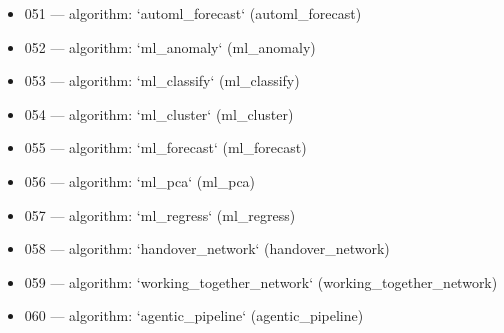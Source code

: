\begin{itemize}
  \item 051 — algorithm: `automl\_forecast` (automl\_forecast)
  \item 052 — algorithm: `ml\_anomaly` (ml\_anomaly)
  \item 053 — algorithm: `ml\_classify` (ml\_classify)
  \item 054 — algorithm: `ml\_cluster` (ml\_cluster)
  \item 055 — algorithm: `ml\_forecast` (ml\_forecast)
  \item 056 — algorithm: `ml\_pca` (ml\_pca)
  \item 057 — algorithm: `ml\_regress` (ml\_regress)
  \item 058 — algorithm: `handover\_network` (handover\_network)
  \item 059 — algorithm: `working\_together\_network` (working\_together\_network)
  \item 060 — algorithm: `agentic\_pipeline` (agentic\_pipeline)
\end{itemize}

